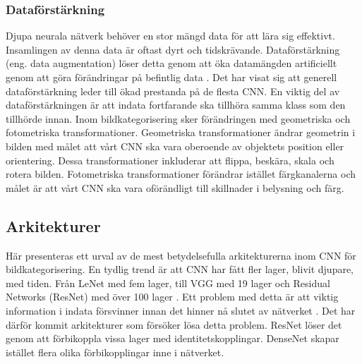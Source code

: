 \documentclass[]{kththesis}
\begin{document}
\subsubsection{Dataförstärkning}
Djupa neurala nätverk behöver en stor mängd data för att lära sig effektivt. Insamlingen av denna data är oftast dyrt och tidskrävande. Dataförstärkning (eng. data augmentation) löser detta genom att öka datamängden artificiellt genom att göra förändringar på befintlig data \parencite{taylor2017improving}. Det har visat sig att generell dataförstärkning leder till ökad prestanda på de flesta CNN. En viktig del av dataförstärkningen är att indata fortfarande ska tillhöra samma klass som den tillhörde innan. Inom bildkategorisering sker förändringen med geometriska och fotometriska transformationer. Geometriska transformationer ändrar geometrin i bilden med målet att vårt CNN ska vara oberoende av objektets position eller orientering. Dessa transformationer inkluderar att flippa, beskära, skala och rotera bilden. Fotometriska transformationer förändrar istället färgkanalerna och målet är att vårt CNN ska vara oförändligt till skillnader i belysning och färg. 

\subsection{Arkitekturer}
Här presenteras ett urval av de mest betydelsefulla arkitekturerna inom CNN för bildkategorisering. En tydlig trend är att CNN har fått fler lager, blivit djupare, med tiden. Från LeNet \parencite{lecun1998gradient} med fem lager, till VGG med 19 lager \parencite{simonyan2014very} och Residual Networks (ResNet) med över 100 lager \parencite{he2016deep}. Ett problem med detta är att viktig information i indata försvinner innan det hinner nå slutet av nätverket \parencite{huang2017densely}. Det har därför kommit arkitekturer som försöker lösa detta problem. ResNet löser det genom att förbikoppla vissa lager med identitetskopplingar. DenseNet skapar istället flera olika förbikopplingar inne i nätverket.
\end{document}
